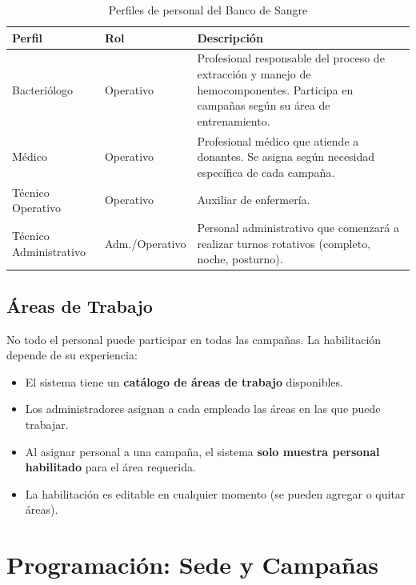 \documentclass[9pt,a4paper]{extarticle}
\begin{document}
\begin{table}[h!]
\centering
\begin{tabularx}{\textwidth}{|l|l|X|}
\hline
\textbf{Perfil} & \textbf{Rol} & \textbf{Descripci\'{o}n} \\
\hline
Bacteri\'{o}logo & Operativo & Profesional responsable del proceso de extracci\'{o}n y manejo de hemocomponentes. Participa en campañas seg\'{u}n su \'{a}rea de entrenamiento. \\
\hline
M\'{e}dico & Operativo & Profesional m\'{e}dico que atiende a donantes. Se asigna seg\'{u}n necesidad espec\'{i}fica de cada campaña. \\
\hline
T\'{e}cnico Operativo & Operativo & Auxiliar de enfermer\'{i}a.\\
\hline
T\'{e}cnico Administrativo & Adm./Operativo & Personal administrativo que comenzar\'{a} a realizar turnos rotativos (completo, noche, posturno). \\
\hline
\end{tabularx}
\caption{Perfiles de personal del Banco de Sangre}
\end{table}

\subsection{\'{A}reas de Trabajo}

No todo el personal puede participar en todas las campañas. La habilitaci\'{o}n depende de su experiencia:

\begin{itemize}[leftmargin=2em]
    \item El sistema tiene un \textbf{cat\'{a}logo de \'{a}reas de trabajo} disponibles.
    \item Los administradores asignan a cada empleado las \'{a}reas en las que puede trabajar.
    \item Al asignar personal a una campaña, el sistema \textbf{solo muestra personal habilitado} para el \'{a}rea requerida.
    \item La habilitaci\'{o}n es editable en cualquier momento (se pueden agregar o quitar \'{a}reas).
\end{itemize}

\section{Programaci\'{o}n: Sede y Campañas}
\end{document}
